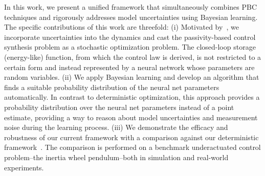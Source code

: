 In this work, we present a unified framework that simultaneously combines PBC
techniques and rigorously addresses model uncertainties using Bayesian learning.
%
{\color{magenta} The specific contributions of this work are threefold: (i)
Motivated by~\cite{sirichotiyakul2020data}, we incorporate uncertainties into
the dynamics and cast the passivity-based control synthesis problem as a
stochastic optimization problem.
%
The closed-loop storage (energy-like) function, from which the control law is
derived, is not restricted to a certain form and instead represented by a neural
network whose parameters are random variables.
%
%
(ii) We apply Bayesian learning and develop an algorithm that finds
a suitable probability distribution of the neural net parameters automatically.
%
In contrast to deterministic optimization, this approach provides a probability
distribution over the neural net parameters instead of a point estimate,
providing a way to reason about model uncertainties and measurement noise during
the learning process.
%
(iii) We demonstrate the efficacy and robustness of our current framework with a
comparison against our deterministic
framework~\cite{sirichotiyakul2020data}. The comparison is performed on a
benchmark underactuated control problem--the inertia wheel pendulum--both in
simulation and real-world experiments. 
}


